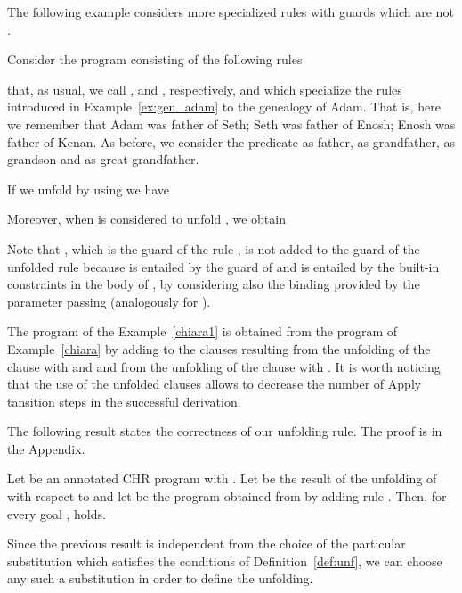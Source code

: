 \documentclass{tlp}
\begin{document}
The following example considers more specialized rules  with guards which are not .

\begin{example}\label{ex:gen_adam_refined}
Consider the program consisting of the following rules

that, as usual, we call , and , respectively, and which specialize the rules introduced in Example~\ref{ex:gen_adam}
to the genealogy of Adam. That is,  here we remember that Adam was father of Seth; Seth was father
of Enosh; Enosh was father of Kenan. As before, we consider the predicate  as father,
 as grandfather,  as grandson and  as great-grandfather.


If we unfold  by using  we have

Moreover, when   is considered to unfold , we obtain


Note that  , which is the guard of the rule
, is not
added to the guard of the unfolded rule  because  is
entailed by the guard of  and  is entailed
by the built-in constraints in the body of , by considering also the binding provided by the parameter passing (analogously for ).
\end{example}

\begin{example}\label{ex:chiara2}
The program  of the Example~\ref{chiara1} is obtained from the program  of Example~\ref{chiara} by adding to 
 the clauses resulting from the unfolding of the clause  with  and  and from the unfolding of the clause  with . It is worth noticing  that the use of the unfolded clauses allows to decrease the number of Apply tansition steps in the successful derivation.
\end{example}


The following result states the correctness of our unfolding rule. The proof is in the Appendix.

\begin{proposition}\label{prop:equality}
Let  be an annotated CHR program with
. Let   be the result
of the unfolding of  with respect to  and let  be the program
obtained from  by adding rule . Then, for every goal ,
 holds.
\end{proposition}

Since the previous result is independent from the choice of the particular substitution
 which satisfies the conditions of Definition~\ref{def:unf}, we can choose any such a substitution in order to define the unfolding.
\end{document}
